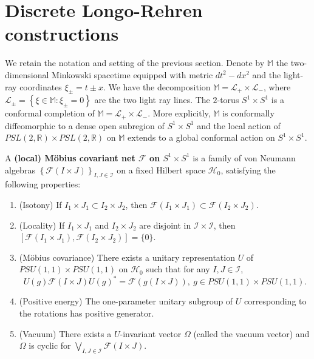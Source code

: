 \documentclass{article}
\newcommand{\hilb}{\mathcal{H}}
\newcommand{\R}{\mathbb{R}}
\begin{document}
\section{Discrete Longo-Rehren constructions}
We retain the notation and setting of the previous section. 
Denote by $\mathbb{M}$ the two-dimensional Minkowski spacetime equipped with metric $dt^2 - dx^2$
and the light-ray coordinates 
$\xi_{\pm} = t \pm x$. 
We have the decomposition 
$\mathbb{M} = \mathcal{L}_+ \times \mathcal{L}_-$, 
where 
$\mathcal{L}_{\pm} = \left\{\xi\in\mathbb{M} :\xi_{\pm} = 0 \right\}$
are the two light ray lines. The $2$-torus 
$S^1 \times S^1$ is a conformal completion of 
$\mathbb{M} = \mathcal{L}_+ \times \mathcal{L}_-$. More explicitly, $\mathbb{M}$
is conformally diffeomorphic to a dense open subregion of $S^1 \times S^1$ and the local action
of $PSL(2,\R) \times PSL(2,\R) $ on $\mathbb{M}$ extends to a global conformal action on $S^1 \times S^1$.

    
A \textbf{(local) M\"{o}bius  covariant  net $\mathcal{F}$ on 
$S^1 \times S^1$ } is a family of von Neumann algebras
$\left\{\mathcal{F}(I\times J) \right\}_{I, J \in\mathcal{I}}$ on a fixed Hilbert space $\hilb_0$, 
satisfying the following properties:
\begin{enumerate}
    \item (Isotony) If $I_1 \times J_1 \subset I_2 \times J_2$,
    then $\mathcal{F}(I_1 \times J_1) \subset \mathcal{F}(I_2 \times J_2)$. 
    \item (Locality) If $I_1 \times J_1$ and $I_2 \times J_2$ are disjoint in $\mathcal{I} \times \mathcal{I}$, then
        $[\mathcal{F}(I_1 \times J_1),\mathcal{F}(I_2 \times J_2)] = \{ 0\}$. 
    \item (M\"{o}bius covariance)
    There exists a unitary representation 
    $U$ of $PSU(1,1) \times PSU(1,1) $ on $\hilb_0$ such that 
    for any $I, J \in \mathcal{I}$, 
    \[
    U(g) \mathcal{F}(I\times J) U(g)^*
 = \mathcal{F}(g(I \times J)), \ g \in PSU(1,1) \times PSU(1,1).    \]
    \item (Positive energy) The one-parameter unitary subgroup of $U$ corresponding to
    the rotations has positive generator.
    \item (Vacuum) There exists a $U$-invariant 
    vector $\Omega$ (called the vacuum vector)
    and $\Omega$ is cyclic for $\bigvee_{I,J\in\mathcal{I}}\mathcal{F}(I\times J)$. 
\end{enumerate}
\end{document}
